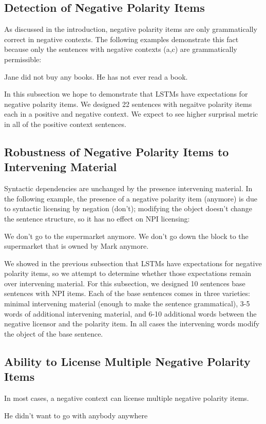 \documentclass[11pt]{article}
\begin{document}
\subsection{Detection of Negative Polarity Items}
As discussed in the introduction, negative polarity items are only grammatically correct in negative contexts. The following examples demonstrate this fact because only the sentences with negative contexts (a,c) are grammatically permissible:
\begin{exe}
[]
\begin{xlist}
\ex Jane did not buy any books.
\ex He has not ever read a book.
\end{xlist}
\end{exe}
In this subsection we hope to demonstrate that LSTMs have expectations for negative polarity items. We designed 22 sentences with negaitve polarity items each in a positive and negative context. We expect to see higher surprisal metric in all of the positive context sentences. 
\subsection{Robustness of Negative Polarity Items to Intervening Material}
Syntactic dependencies are unchanged by the presence intervening material. In the following example, the presence of a negative polarity item (anymore) is due to syntactic licensing by negation (don't); modifying the object doesn't change the sentence structure, so it has no effect on NPI licensing:
\begin{exe}
[]
\begin{xlist}
\ex We don't go to the supermarket anymore.
\ex We don't go down the block to the supermarket that is owned by Mark anymore. 
\end{xlist}
\end{exe}
We showed in the previous subsection that LSTMs have expectations for negative polarity items, so we attempt to determine whether those expectations remain over intervening material. For this subsection, we designed 10 sentences base sentences with NPI items. Each of the base sentences comes in three varieties: minimal intervening material (enough to make the sentence grammatical), 3-5 words of additional intervening material, and 6-10 additional words between the negative licensor and the polarity item. In all cases the intervening words modify the object of the base sentence.
\subsection{Ability to License Multiple Negative Polarity Items}
In most cases, a negative context can license multiple negative polarity items.
\begin{exe}
[]
\begin{xlist}
\ex He didn't want to go with anybody anywhere
\end{xlist}
\end{exe}
\end{document}

